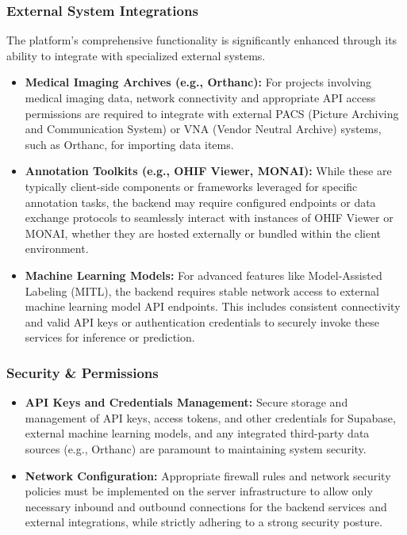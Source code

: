 \subsubsection{External System Integrations}
The platform's comprehensive functionality is significantly enhanced through its ability to integrate with specialized external systems.
\begin{itemize}
    \item \textbf{Medical Imaging Archives (e.g., Orthanc):} For projects involving medical imaging data, network connectivity and appropriate API access permissions are required to integrate with external PACS (Picture Archiving and Communication System) or VNA (Vendor Neutral Archive) systems, such as Orthanc, for importing data items.
    \item \textbf{Annotation Toolkits (e.g., OHIF Viewer, MONAI):} While these are typically client-side components or frameworks leveraged for specific annotation tasks, the backend may require configured endpoints or data exchange protocols to seamlessly interact with instances of OHIF Viewer or MONAI, whether they are hosted externally or bundled within the client environment.
    \item \textbf{Machine Learning Models:} For advanced features like Model-Assisted Labeling (MITL), the backend requires stable network access to external machine learning model API endpoints. This includes consistent connectivity and valid API keys or authentication credentials to securely invoke these services for inference or prediction.
\end{itemize}

\subsubsection{Security \& Permissions}
\begin{itemize}
    \item \textbf{API Keys and Credentials Management:} Secure storage and management of API keys, access tokens, and other credentials for Supabase, external machine learning models, and any integrated third-party data sources (e.g., Orthanc) are paramount to maintaining system security.
    \item \textbf{Network Configuration:} Appropriate firewall rules and network security policies must be implemented on the server infrastructure to allow only necessary inbound and outbound connections for the backend services and external integrations, while strictly adhering to a strong security posture.
\end{itemize}
